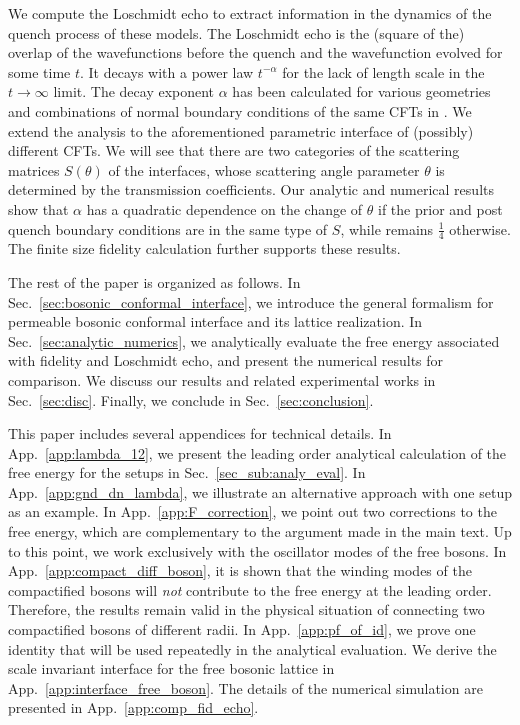 We compute the Loschmidt echo to extract information in the dynamics of the quench process of these models. The Loschmidt echo is the (square of the) overlap of the wavefunctions before the quench and the wavefunction evolved for some time $t$. It decays with a power law $t^{- \alpha}$ for the lack of length scale in the $t \rightarrow \infty$ limit. The decay exponent $\alpha$ has been calculated for various geometries and combinations of normal boundary conditions of the same CFTs in . We extend the analysis to the aforementioned parametric interface of (possibly) different CFTs. We will see that there are two categories of the scattering matrices $S(\theta)$ of the interfaces, whose scattering angle parameter $\theta$ is determined by the transmission coefficients. Our analytic and numerical results show that $\alpha$ has a quadratic dependence on the change of $\theta$ if the prior and post quench boundary conditions are in the same type of $S$, while remains $\frac{1}{4}$ otherwise. The finite size fidelity calculation further supports these results. 

The rest of the paper is organized as follows. In Sec.~\ref{sec:bosonic_conformal_interface}, we introduce the general formalism for permeable bosonic conformal interface and its lattice realization. In Sec.~\ref{sec:analytic_numerics}, we analytically evaluate the free energy associated with fidelity and Loschmidt echo, and present the numerical results for comparison. We discuss our results and related experimental works in Sec.~\ref{sec:disc}. Finally, we conclude in Sec.~\ref{sec:conclusion}. 

This paper includes several appendices for technical details. In App.~\ref{app:lambda_12}, we present the leading order analytical calculation of the free energy for the setups in Sec.~\ref{sec_sub:analy_eval}. In App.~\ref{app:gnd_dn_lambda}, we illustrate an alternative approach with one setup as an example. In App.~\ref{app:F_correction}, we point out two corrections to the free energy, which are complementary to the argument made in the main text. Up to this point, we work exclusively with the oscillator modes of the free bosons. In App.~\ref{app:compact_diff_boson}, it is shown that the winding modes of the compactified bosons will \emph{not} contribute to the free energy at the leading order. Therefore, the results remain valid in the physical situation of connecting two compactified bosons of different radii. In App.~\ref{app:pf_of_id}, we prove one identity that will be used repeatedly in the analytical evaluation. We derive the scale invariant interface for the free bosonic lattice in App.~\ref{app:interface_free_boson}. The details of the numerical simulation are presented in App.~\ref{app:comp_fid_echo}.


